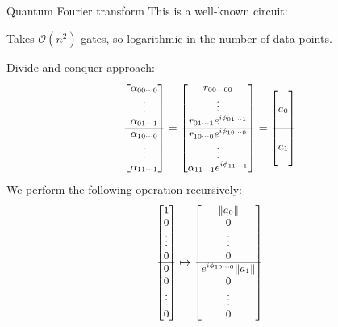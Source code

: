 \begin{frame}{Quantum Fourier transform}
	This is a well-known circuit:
	
	\pause 
	\begin{center}
		
	\end{center}
	
	\pause
	Takes $\mathcal{O}(n^2)$ gates, so logarithmic in the number of data points.
\end{frame}

\begin{frame}
	Divide and conquer approach:
	\[\small \begin{bmatrix}
		\alpha_{00\cdots0} \\ \vdots \\ \alpha_{01\cdots1} \\\hline \alpha_{10\cdots0} \\ \vdots \\ \alpha_{11\cdots1}
	\end{bmatrix} = \begin{bmatrix}
		r_{00\cdots00} \\ \vdots \\ r_{01\cdots1}e^{i\phi_{01\cdots1}} \\\hline r_{10\cdots0}e^{i\phi_{10\cdots0}} \\ \vdots \\ \alpha_{11\cdots1}e^{i\phi_{11\cdots1}}
	\end{bmatrix} = \begin{bmatrix}
		\\ a_0 \\ \\ \hline \\ a_1 \\ \\
	\end{bmatrix}\]
	\pause
	We perform the following operation recursively:
	\[\small \begin{bmatrix}
		1 \\ 0 \\ \vdots \\ 0 \\\hline 0 \\ 0 \\ \vdots \\ 0
	\end{bmatrix} \mapsto \begin{bmatrix}
		\lVert a_0\rVert \\ 0 \\ \vdots \\ 0 \\\hline e^{i\phi_{10\cdots0}}\lVert a_1\rVert \\ 0 \\ \vdots \\ 0
	\end{bmatrix}\]
\end{frame}

